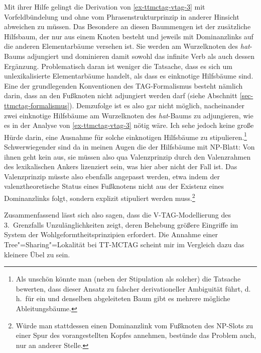 Mit ihrer Hilfe gelingt die Derivation von \ref{ex-ttmctag-vtag-3} mit Vorfeldbündelung und ohne vom Phrasenstrukturprinzip in anderer Hinsicht abweichen zu müssen. Das Besondere an diesen Baummengen ist der zusätzliche Hilfsbaum, der nur aus einem Knoten besteht und jeweils mit Dominanzlinks auf die anderen Elementarbäume versehen ist. Sie werden am Wurzelknoten des {\it hat}-Baums adjungiert und dominieren damit sowohl das infinite Verb als auch dessen Ergänzung. Problematisch daran ist weniger die Tatsache, dass es sich um unlexikalisierte Elementarbäume handelt, als dass es einknotige Hilfsbäume sind. Eine der grundlegenden Konventionen des TAG-Formalismus besteht nämlich darin, dass an den Fu\ss knoten nicht adjungiert werden darf (siehe Abschnitt \ref{sec-ttmctag-formalismus}). Demzufolge ist es also gar nicht möglich, nacheinander zwei einknotige Hilfsbäume am Wurzelknoten des {\it hat}-Baums zu adjungieren, wie es in der Analyse von \ref{ex-ttmctag-vtag-3} nötig wäre. Ich sehe jedoch keine große Hürde darin, eine Ausnahme für solche einknotigen Hilfsbäume zu stipulieren.\footnote{Als unschön könnte man (neben der Stipulation als solcher) die Tatsache bewerten, dass dieser Ansatz zu falscher derivationeller Ambiguität führt, d.\,h.\ für ein und denselben abgeleiteten Baum gibt es mehrere mögliche Ableitungsbäume.} Schwerwiegender sind da in meinen Augen die  der Hilfsbäume mit NP-Blatt: Von ihnen geht kein  aus, sie müssen also qua Valenzprinzip durch den Valenzrahmen des lexikalischen Ankers lizenziert sein, was hier aber nicht der Fall ist. Das Valenzprinzip müsste also ebenfalls angepasst werden, etwa indem der valenztheoretische Status eines Fu\ss knotens nicht aus der Existenz eines Dominanzlinks folgt, sondern explizit stipuliert werden muss.\footnote{Würde man stattdessen einen Dominanzlink vom Fußknoten des NP-Slots zu einer Spur des vorangestellten Kopfes annehmen, bestünde das Problem auch, nur an anderer Stelle.}
\largerpage%

Zusammenfassend lässt sich also sagen, dass die V-TAG-Modellierung des 3.\ Grenzfalls Unzulänglichkeiten zeigt, deren Behebung grö\ss ere Eingriffe im System der Wohlgeformtheitsprinzipien erfordert. Die Annahme einer Tree"=Sharing"=Lokalität bei TT-MCTAG scheint mir im Vergleich dazu das kleinere Übel zu sein.
\largerpage%


